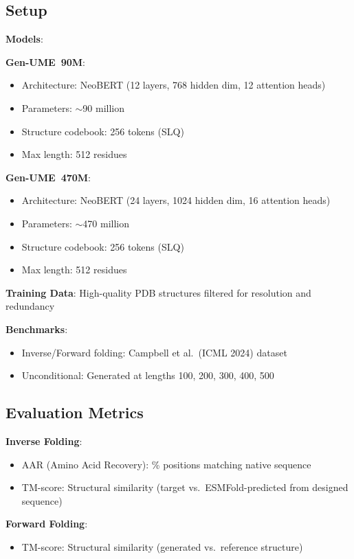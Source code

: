 \documentclass[11pt,a4paper]{article}
\newcommand{\genume}{Gen-UME}
\begin{document}
\subsection{Setup}

\textbf{Models}: 

\textbf{\genume~90M}:
\begin{itemize}
\item Architecture: NeoBERT (12 layers, 768 hidden dim, 12 attention heads)
\item Parameters: $\sim$90 million
\item Structure codebook: 256 tokens (SLQ)
\item Max length: 512 residues
\end{itemize}

\textbf{\genume~470M}:
\begin{itemize}
\item Architecture: NeoBERT (24 layers, 1024 hidden dim, 16 attention heads)
\item Parameters: $\sim$470 million
\item Structure codebook: 256 tokens (SLQ)
\item Max length: 512 residues
\end{itemize}

\textbf{Training Data}: High-quality PDB structures filtered for resolution and redundancy

\textbf{Benchmarks}:
\begin{itemize}
\item Inverse/Forward folding: Campbell et al.~(ICML 2024) dataset
\item Unconditional: Generated at lengths 100, 200, 300, 400, 500
\end{itemize}

\subsection{Evaluation Metrics}

\textbf{Inverse Folding}:
\begin{itemize}
\item AAR (Amino Acid Recovery): \% positions matching native sequence
\item TM-score: Structural similarity (target vs.~ESMFold-predicted from designed sequence)
\end{itemize}

\textbf{Forward Folding}:
\begin{itemize}
\item TM-score: Structural similarity (generated vs.~reference structure)
\end{itemize}
\end{document}
